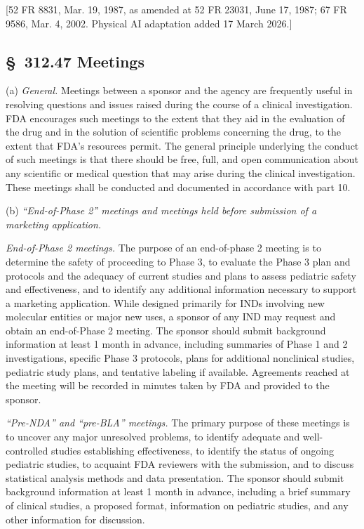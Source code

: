 \documentclass[11pt]{article}
\begin{document}
[52 FR 8831, Mar. 19, 1987, as amended at 52 FR 23031, June 17, 1987; 67 FR 9586, Mar. 4, 2002. Physical AI adaptation added 17 March 2026.]

\subsection{\S~312.47 Meetings}

(a) \textit{General.} Meetings between a sponsor and the agency are frequently useful in resolving questions and issues raised during the course of a clinical investigation. FDA encourages such meetings to the extent that they aid in the evaluation of the drug and in the solution of scientific problems concerning the drug, to the extent that FDA's resources permit. The general principle underlying the conduct of such meetings is that there should be free, full, and open communication about any scientific or medical question that may arise during the clinical investigation. These meetings shall be conducted and documented in accordance with part 10.

(b) \textit{``End-of-Phase 2'' meetings and meetings held before submission of a marketing application.}

\begin{description}[leftmargin=0.5cm,style=sameline]
\item[(1)] \textit{End-of-Phase 2 meetings.} The purpose of an end-of-phase 2 meeting is to determine the safety of proceeding to Phase 3, to evaluate the Phase 3 plan and protocols and the adequacy of current studies and plans to assess pediatric safety and effectiveness, and to identify any additional information necessary to support a marketing application. While designed primarily for INDs involving new molecular entities or major new uses, a sponsor of any IND may request and obtain an end-of-Phase 2 meeting. The sponsor should submit background information at least 1 month in advance, including summaries of Phase 1 and 2 investigations, specific Phase 3 protocols, plans for additional nonclinical studies, pediatric study plans, and tentative labeling if available. Agreements reached at the meeting will be recorded in minutes taken by FDA and provided to the sponsor.

\item[(2)] \textit{``Pre-NDA'' and ``pre-BLA'' meetings.} The primary purpose of these meetings is to uncover any major unresolved problems, to identify adequate and well-controlled studies establishing effectiveness, to identify the status of ongoing pediatric studies, to acquaint FDA reviewers with the submission, and to discuss statistical analysis methods and data presentation. The sponsor should submit background information at least 1 month in advance, including a brief summary of clinical studies, a proposed format, information on pediatric studies, and any other information for discussion.
\end{description}
\end{document}
